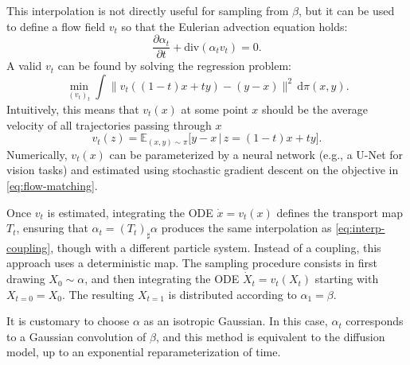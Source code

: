 This interpolation is not directly useful for sampling from $\beta$, but it can be used to define a flow field $v_t$ so that the Eulerian advection equation holds:
\begin{equation}
    \frac{\partial \alpha_t}{\partial t} + \mathrm{div}(\alpha_t v_t) = 0. \label{eq:eulerian-advection}
\end{equation}
A valid $v_t$ can be found by solving the regression problem:
\begin{equation}
    \min_{(v_t)_t} \int \|v_t((1-t)x + ty) - (y - x)\|^2 \, \mathrm{d}\pi(x, y). \label{eq:flow-matching}
\end{equation}
Intuitively, this means that $v_t(x)$ at some point $x$ should be the average velocity of all trajectories passing through $x$
$$
		v_t(z) = \mathbb{E}_{(x, y) \sim \pi} \big[ y - x \, \big| \, z = (1-t)x + t y \big].
$$
Numerically, $v_t(x)$ can be parameterized by a neural network (e.g., a U-Net for vision tasks) and estimated using stochastic gradient descent on the objective in \eqref{eq:flow-matching}.

Once $v_t$ is estimated, integrating the ODE $\dot{x} = v_t(x)$ defines the transport map $T_t$, ensuring that $\alpha_t = (T_t)_\sharp \alpha$ produces the same interpolation as \eqref{eq:interp-coupling}, though with a different particle system. Instead of a coupling, this approach uses a deterministic map.
The sampling procedure consists in first drawing $X_0 \sim \alpha$, and then integrating the ODE $\dot{X}_t = v_t(X_t)$ starting with $X_{t=0} = X_0$. 
The resulting $X_{t=1}$ is distributed according to $\alpha_1 = \beta$.

It is customary to choose $\alpha$ as an isotropic Gaussian. In this case, $\alpha_t$ corresponds to a Gaussian convolution of $\beta$, and this method is equivalent to the diffusion model, up to an exponential reparameterization of time.
